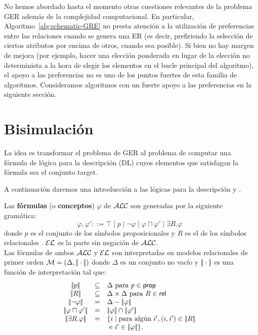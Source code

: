 No hemos abordado hasta el momento otras cuestiones relevantes de la
problema GER adem\'as de la complejidad computacional. En particular,
Algoritmo~\ref{alg:schematic-GRE} no presta atenci\'on a la utilizaci\'on de
preferencias entre las relaciones cuando se genera una ER (es decir, prefiriendo
la selecci\'on de ciertos atributos por encima de otros, cuando sea posible).
Si bien no hay margen de mejora (por ejemplo, hacer una elecci\'on ponderada
en lugar de la elecci\'on no determinista a la hora de elegir los elementos
en el bucle principal del algoritmo), el apoyo a las preferencias no es
uno de los puntos fuertes de esta familia de algoritmos.
Consideramos algoritmos con un fuerte apoyo a las preferencias en la siguiente secci\'on.


\section{Bisimulaci\'on}
\label{sec:bisimulacion}


La idea es transformar el problema de GER al problema de computar una f\'ormula de l\'ogica para la descripci\'on (DL) cuyos elementos que satisfagan la f\'ormula sea el conjunto target.%

A continuaci\'on daremos una introducci\'on a las l\'ogicas para la descripci\'on \alc y \el. %

Las {\bf f\'ormulas} (o {\bf conceptos}) $\varphi$ de $\mathcal{ALC}$ son generadas por la siguiente gram\'atica:
$$
\varphi,\varphi' ::= \top \mid p \mid \neg \varphi \mid \varphi \sqcap \varphi'
\mid \exists R. \varphi
$$
donde $p$ es el conjunto de los s\'imbolos proposicionales \prop y $R$ es el de los s\'imbolos relacionales \rel. $\mathcal{EL}$ es la parte sin negaci\'on de $\mathcal{ALC}$.\\

Las f\'ormulas de ambos $\mathcal{ALC}$ y $\mathcal{EL}$ son interpretadas en modelos relacionales de primer orden $\mathcal{M} = (\Delta,|\!|\cdot|\!|)$ donde
$\Delta$ es un conjunto no vac\'io y $|\!|\cdot|\!|$ es una funci\'on de interpretaci\'on tal que:
$$
\begin{array}{ccl}
\interp{p} & \subseteq & \Delta  \mbox{ para $p \in \prop$}\\
\interp{R} & \subseteq & \Delta \times \Delta  \mbox{ para $R \in \rel$}\\
\interp{\neg \varphi} & = & \Delta - \interp{\varphi}\\
\interp{\varphi \sqcap \varphi'} & = & \interp{\varphi} \cap \interp{\varphi'}\\
\interp{\exists R.\varphi} & = & \{i \mid \mbox{para alg\'un } i', (i,i') \in \interp{R}\\
& & \mbox{ e } i' \in \interp{\varphi} \}.\\
\end{array}
$$

